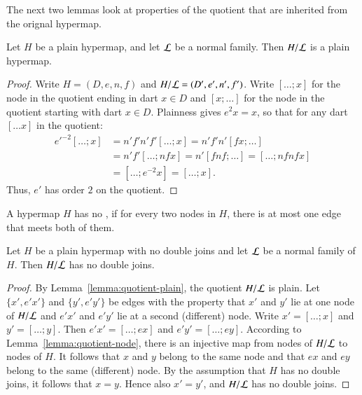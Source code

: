 The next two lemmas look at properties of the quotient that are
inherited from the orignal hypermap.

\begin{lemma}
Let $H$ be a plain hypermap, and let $\cal L$ be a
normal family.  Then $H/{\cal L}$ is a plain hypermap.
\end{lemma}

\begin{proof}  Write $H=(D,e,n,f)$ and $H/{\cal L} = (D',e',n',f')$.  
Write $[\ldots; x]$ for the node in
the quotient ending in dart $x\in D$ and $[x;\ldots]$ for the node
in the quotient starting with dart $x\in D$.  Plainness gives $e^2 x
= x$, so that for any dart $[\ldots x]$ in the quotient:
\begin{displaymath}\begin{array}{lll}
{e'}^{-2} [\ldots; x] &= n' f' n' f' [\ldots; x] = n' f' n' [f x; \ldots] \\&=
n' f' [\ldots; n f x] = n' [f n f; \ldots] = [\ldots; n f n f x]\\ &=
[\ldots; e^{-2} x] = [\ldots; x].
\end{array}\end{displaymath}
Thus, $e'$ has order $2$ on the quotient.
\end{proof}




\begin{definition}
A hypermap $H$ has no , if for every two nodes
in $H$, there is at most one edge that meets both of them.
\end{definition}


\begin{lemma}
Let $H$ be a plain hypermap with no double joins and let ${\cal L}$ be a normal
family of $H$.  Then $H/{\cal L}$ has no double joins.
\end{lemma}

\begin{proof} By Lemma~\ref{lemma:quotient-plain}, the quotient
  $H/{\cal L}$ is plain.  Let $\{x',e'x'\}$ and $\{y',e'y'\}$ be edges
  with the property that $x'$ and $y'$ lie at one node of $H/{\cal L}$
  and $e'x'$ and $e'y'$ lie at a second (different) node.  Write $x' =
  [\ldots;x]$ and $y' = [\ldots;y]$.  Then $e'x' = [\ldots;e x]$ and
  $e'y' = [\ldots;e y]$.  According to
  Lemma~\ref{lemma:quotient-node}, there is an injective map from
  nodes of $H/{\cal L}$ to nodes of $H$.  It follows that $x$ and $y$
  belong to the same node and that $e x$ and $e y$ belong to the same
  (different) node.  By the assumption that $H$ has no double joins,
  it follows that $x=y$.  Hence also $x' = y'$, and $H/{\cal L}$ has
  no double joins.
\end{proof}


